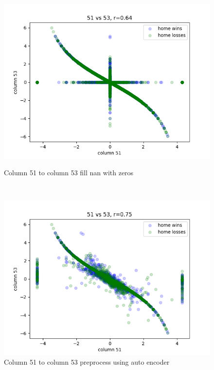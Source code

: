 \documentclass[12pt,a4paper]{article}
\begin{document}
\begin{figure}[ht]
    \centering
    \begin{minipage}{.4\textwidth}
        \centering
        \includegraphics[width=0.8\linewidth]{images/0.64r_51_to_53.png}
        \caption[width=0.8\linewidth]{Column 51 to column 53 fill nan with zeros}
        \label{fig:51-53}
    \end{minipage}%
    \begin{minipage}{.1\textwidth}
        \ 
    \end{minipage}%
    \begin{minipage}{.4\textwidth}
        \centering
        \includegraphics[width=0.8\linewidth]{images/0.75r_51_to_53_recovered.png}
        \caption[width=0.8\linewidth]{Column 51 to column 53 preprocess using auto encoder}
        \label{fig:51-53r}
    \end{minipage}


\end{figure}
\end{document}
